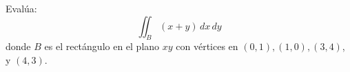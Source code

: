 Evalúa: 
\[\iint_B (x+y) \, dx \, dy\]
donde $B$ es el rectángulo en el plano $xy$ con vértices en $(0,1),(1,0),(3,4)$, y $(4,3)$.
